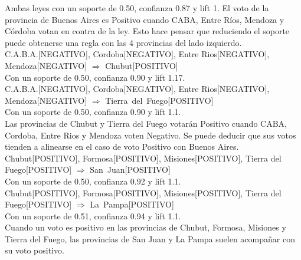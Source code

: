 \documentclass{endm}
\begin{document}
Ambas leyes con un soporte de 0.50, confianza 0.87 y lift 1. El voto de la provincia de Buenos Aires es Positivo cuando CABA, Entre Ríos, Mendoza y Córdoba votan en contra de la ley. Esto hace pensar que reduciendo el soporte puede obtenerse una regla con las 4 provincias del lado izquierdo. \\

{C.A.B.A.[NEGATIVO],                            Cordoba[NEGATIVO],                              Entre Rios[NEGATIVO],                           Mendoza[NEGATIVO]}  $\Longrightarrow$ {Chubut[POSITIVO]} \\

Con un soporte de 0.50, confianza 0.90 y lift 1.17.  \\

{C.A.B.A.[NEGATIVO],                            Cordoba[NEGATIVO],                             Entre Rios[NEGATIVO],                           Mendoza[NEGATIVO]} $\Longrightarrow$ {Tierra\ del\ Fuego[POSITIVO]}  \\

Con un soporte de 0.50, confianza 0.90 y lift 1.1.  \\

Las provincias de Chubut y Tierra del Fuego votarán Positivo cuando CABA, Cordoba, Entre Rios y Mendoza voten Negativo. Se puede deducir que sus votos tienden a alinearse en el caso de voto Positivo con Buenos Aires. \\


{Chubut[POSITIVO],                              Formosa[POSITIVO],                              Misiones[POSITIVO],                             Tierra del Fuego[POSITIVO]} $\Longrightarrow$ {San\ Juan[POSITIVO]}  \\    


Con un soporte de 0.50, confianza 0.92 y lift 1.1. \\

{Chubut[POSITIVO],                              Formosa[POSITIVO],                              Misiones[POSITIVO],                             Tierra del Fuego[POSITIVO]} $\Longrightarrow$ {La\ Pampa[POSITIVO]}  \\

Con un soporte de 0.51, confianza 0.94 y lift 1.1. \\

Cuando un voto es positivo en las provincias de Chubut, Formosa, Misiones y Tierra del Fuego, las provincias de San Juan y La Pampa suelen acompañar con su voto positivo. \\
\end{document}
